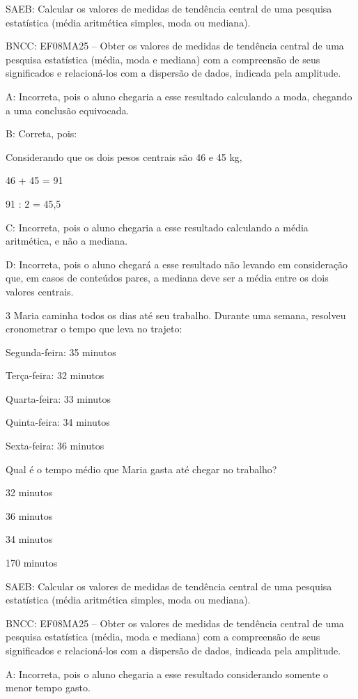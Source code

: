 {SAEB: Calcular os valores de medidas de tendência central de uma
pesquisa estatística (média aritmética simples, moda ou mediana).

BNCC: EF08MA25 -- Obter os valores de medidas de tendência central de
uma pesquisa estatística (média, moda e mediana) com a compreensão de
seus significados e relacioná-los com a dispersão de dados, indicada
pela amplitude.

A: Incorreta, pois o aluno chegaria a esse resultado calculando a moda,
chegando a uma conclusão equivocada.

B: Correta, pois:

Considerando que os dois pesos centrais são 46 e 45 kg,

46 + 45 = 91

91 : 2 = 45,5

C: Incorreta, pois o aluno chegaria a esse resultado calculando a média
aritmética, e não a mediana.

D: Incorreta, pois o aluno chegará a esse resultado não levando em
consideração que, em casos de conteúdos pares, a mediana deve ser a
média entre os dois valores centrais.

\num{3} Maria caminha todos os dias até seu trabalho. Durante uma semana,
resolveu cronometrar o tempo que leva no trajeto:

Segunda-feira: 35 minutos

Terça-feira: 32 minutos

Quarta-feira: 33 minutos

Quinta-feira: 34 minutos

Sexta-feira: 36 minutos

Qual é o tempo médio que Maria gasta até chegar no trabalho?
\item 32 minutos
\item 36 minutos
\item 34 minutos
\item 170 minutos

SAEB: Calcular os valores de medidas de tendência central de uma
pesquisa estatística (média aritmética simples, moda ou mediana).

BNCC: EF08MA25 -- Obter os valores de medidas de tendência central de
uma pesquisa estatística (média, moda e mediana) com a compreensão de
seus significados e relacioná-los com a dispersão de dados, indicada
pela amplitude.

A: Incorreta, pois o aluno chegaria a esse resultado considerando
somente o menor tempo gasto.

}
